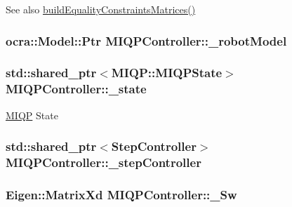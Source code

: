 \begin{DoxySeeAlso}{\-See also}
\hyperlink{classMIQPController_a870c7d3c0e5fcfd46f7bb95924007082}{build\-Equality\-Constraints\-Matrices()} 
\end{DoxySeeAlso}
\hypertarget{classMIQPController_a03735ecec3242cdfc9bf8a443c561724}{
\subsubsection[{\-\_\-robot\-Model}]{\setlength{\rightskip}{0pt plus 5cm}ocra\-::\-Model\-::\-Ptr {\bf \-M\-I\-Q\-P\-Controller\-::\-\_\-robot\-Model}}}\label{classMIQPController_a03735ecec3242cdfc9bf8a443c561724}
\hypertarget{classMIQPController_aeaa4c96afe2d1d975667338e858f4a90}{
\subsubsection[{\-\_\-state}]{\setlength{\rightskip}{0pt plus 5cm}std\-::shared\-\_\-ptr$<${\bf \-M\-I\-Q\-P\-::\-M\-I\-Q\-P\-State}$>$ {\bf \-M\-I\-Q\-P\-Controller\-::\-\_\-state}}}\label{classMIQPController_aeaa4c96afe2d1d975667338e858f4a90}
\hyperlink{namespaceMIQP}{\-M\-I\-Q\-P} \-State \hypertarget{classMIQPController_a10018469a257136470ad9293fc3fe84a}{
\subsubsection[{\-\_\-step\-Controller}]{\setlength{\rightskip}{0pt plus 5cm}std\-::shared\-\_\-ptr$<${\bf \-Step\-Controller}$>$ {\bf \-M\-I\-Q\-P\-Controller\-::\-\_\-step\-Controller}}}\label{classMIQPController_a10018469a257136470ad9293fc3fe84a}
\hypertarget{classMIQPController_ada92fc35065a11b889019f2948c1888d}{
\subsubsection[{\-\_\-\-Sw}]{\setlength{\rightskip}{0pt plus 5cm}\-Eigen\-::\-Matrix\-Xd {\bf \-M\-I\-Q\-P\-Controller\-::\-\_\-\-Sw}}}\label{classMIQPController_ada92fc35065a11b889019f2948c1888d}
